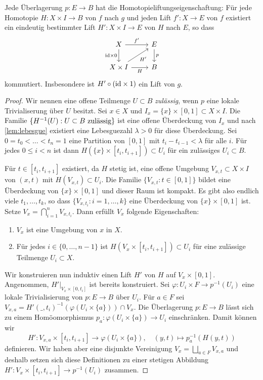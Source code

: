 \begin{theorem}
Jede Überlagerung $p\colon E\to B$ hat die Homotopieliftungseigenschaftung: Für jede Homotopie $H\colon X\times I\to B$ von $f$ nach $g$ und jeden Lift $f'\colon X\to E$ von $f$ existiert ein eindeutig bestimmter Lift $H'\colon X\times I\to E$ von $H$ nach $E$, so dass
\[
\begin{tikzcd}
X \ar[r, "{f'}"] \ar[d, "{\id}\times 0"'] & E \ar[d, "p"] \\
X\times I \ar[r, "H"'] \ar[ru, "{H'}"'] & B
\end{tikzcd}
\]
kommutiert. Insbesondere ist $H'\circ ({\operatorname{\textnormal{id}}}\times 1)$ ein Lift von $g$.
\end{theorem}
\begin{proof}
Wir nennen eine offene Teilmenge $U\subset B$ \emph{zulässig}, wenn $p$ eine lokale Trivialiserung über $U$ besitzt. Sei $x\in X$ und $I_x = \{x\}\times [0,1]\subset X\times I$. Die Familie $\{H^{-1}(U) : \textnormal{$U\subset B$ zulässig}\}$ ist eine offene Überdeckung von $I_x$ und nach \autoref{lem:lebesgue} existiert eine Lebesguezahl $\lambda > 0$ für diese Überdeckung. Sei $0 = t_0 < \dots < t_n = 1$ eine Partition von $[0,1]$ mit $t_i - t_{i-1} < \lambda$ für alle $i$. Für jedes $0\leq i < n$ ist dann $H(\{x\}\times[t_i,t_{i+1}])\subset U_i$ für ein zulässiges $U_i\subset B$.

Für $t\in [t_i,t_{i+1}]$ existiert, da $H$ stetig ist, eine offene Umgebung $V_{x,t}\subset X\times I$ von $(x,t)$ mit $H(V_{x,t})\subset U_i$. Die Familie $\{V_{x,t} : t\in [0,1]\}$ bildet eine Überdeckung von $\{x\}\times [0,1]$ und dieser Raum ist kompakt. Es gibt also endlich viele $t_1,\dots,t_k$, so dass $\{V_{x,t_i} : i=1,\dots, k\}$ eine Überdeckung von $\{x\}\times [0,1]$ ist. Setze $V_x = \bigcap_{i=1}^n V_{x,t_i}$. Dann erfüllt $V_x$ folgende Eigenschaften:
\begin{enumerate}
\item $V_x$ ist eine Umgebung von $x$ in $X$.
\item Für jedes $i\in\{0,\dots,n-1\}$ ist $H(V_x\times [t_i,t_{i+1}])\subset U_i$ für eine zulässige Teilmenge $U_i\subset X$.
\end{enumerate}

Wir konstruieren nun induktiv einen Lift $H'$ von $H$ auf $V_x\times[0,1]$. Angenommen, $H'|_{V_x\times[0,t_i]}$ ist bereits konstruiert. Sei $\varphi\colon U_i\times F \to p^{-1}(U_i)$ eine lokale Trivialisierung von $p\colon E\to B$ über $U_i$. Für $a\in F$ sei $V_{x,a} = H'(\_,t_i)^{-1}(\varphi(U_i\times\{a\}))\cap V_x$. Die Überlagerung $p\colon E\to B$ lässt sich zu einem Homöomorphismus $p_a\colon \varphi(U_i\times\{a\})\to U_i$ einschränken. Damit können wir
\[
H'\colon V_{x,a}\times [t_i,t_{i+1}] \to \varphi(U_i\times\{a\}),\quad (y,t)\mapsto p_a^{-1}(H(y,t))
\]
definieren. Wir haben aber eine disjunkte Vereinigung $V_x = \bigsqcup_{a\in F} V_{x,a}$ und deshalb setzen sich diese Definitionen zu einer stetigen Abbildung $H'\colon V_x\times [t_i,t_{i+1}]\to p^{-1}(U_i)$ zusammen.


\end{proof}
